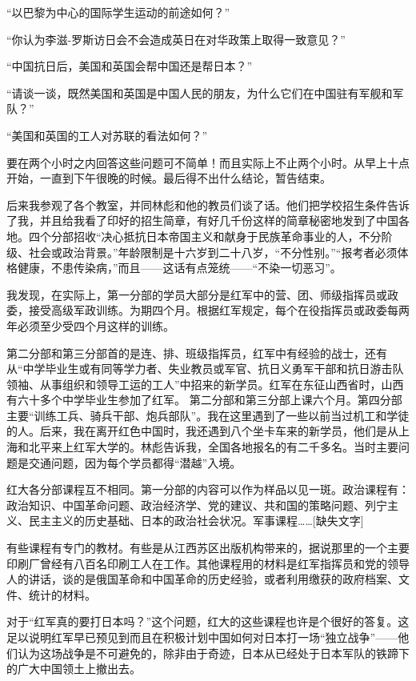 \documentclass[10pt]{book}
\begin{document}
“以巴黎为中心的国际学生运动的前途如何？”

“你认为李滋-罗斯访日会不会造成英日在对华政策上取得一致意见？”

“中国抗日后，美国和英国会帮中国还是帮日本？”

“请谈一谈，既然美国和英国是中国人民的朋友，为什么它们在中国驻有军舰和军队？”

“美国和英国的工人对苏联的看法如何？”

要在两个小时之内回答这些问题可不简单！而且实际上不止两个小时。从早上十点开始，一直到下午很晚的时候。最后得不出什么结论，暂告结束。

后来我参观了各个教室，并同林彪和他的教员们谈了话。他们把学校招生条件告诉了我，并且给我看了印好的招生简章，有好几千份这样的简章秘密地发到了中国各地。四个分部招收“决心抵抗日本帝国主义和献身于民族革命事业的人，不分阶级、社会或政治背景。”年龄限制是十六岁到二十八岁，“不分性别。”“报考者必须体格健康，不患传染病，”而且——这话有点笼统——“不染一切恶习”。

我发现，在实际上，第一分部的学员大部分是红军中的营、团、师级指挥员或政委，接受高级军政训练。为期四个月。根据红军规定，每个在役指挥员或政委每两年必须至少受四个月这样的训练。

第二分部和第三分部首的是连、排、班级指挥员，红军中有经验的战士，还有从“中学毕业生或有同等学力者、失业教员或军官、抗日义勇军干部和抗日游击队领袖、从事组织和领导工运的工人”中招来的新学员。红军在东征山西省时，山西有六十多个中学毕业生参加了红军。 第二分部和第三分部上课六个月。第四分部主要“训练工兵、骑兵干部、炮兵部队”。我在这里遇到了一些以前当过机工和学徒的人。后来，我在离开红色中国时，我还遇到八个坐卡车来的新学员，他们是从上海和北平来上红军大学的。林彪告诉我，全国各地报名的有二千多名。当时主要问题是交通问题，因为每个学员都得“潜越”入境。

红大各分部课程互不相同。第一分部的内容可以作为样品以见一斑。政治课程有：政治知识、中国革命问题、政治经济学、党的建议、共和国的策略问题、列宁主义、民主主义的历史基础、日本的政治社会状况。军事课程……[缺失文字]

有些课程有专门的教材。有些是从江西苏区出版机构带来的，据说那里的一个主要印刷厂曾经有八百名印刷工人在工作。其他课程用的材料是红军指挥员和党的领导人的讲话，谈的是俄国革命和中国革命的历史经验，或者利用缴获的政府档案、文件、统计的材料。

对于“红军真的要打日本吗？”这个问题，红大的这些课程也许是个很好的答复。这足以说明红军早已预见到而且在积极计划中国如何对日本打一场“独立战争”——他们认为这场战争是不可避免的，除非由于奇迹，日本从已经处于日本军队的铁蹄下的广大中国领土上撤出去。
\end{document}
